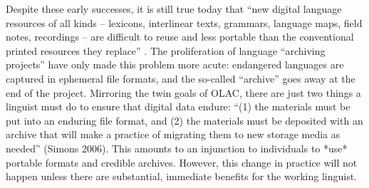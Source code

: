 
Despite these early successes, it is still true today that ``new
digital language resources of all kinds -- lexicons, interlinear
texts, grammars, language maps, field notes, recordings -- are
difficult to reuse and less portable than the conventional printed
resources they replace'' \citep{BirdSimons03language}.  The proliferation of
language ``archiving projects'' have only made this problem more
acute: endangered languages are captured in ephemeral file formats,
and the so-called ``archive'' goes away at the end of the project.
Mirroring the twin goals of OLAC, there are just two things a linguist
must do to ensure that digital data endure: ``(1) the materials must be
put into an enduring file format, and (2) the materials must be
deposited with an archive that will make a practice of migrating them
to new storage media as needed'' (Simons 2006).  This amounts to an
injunction to individuals to *use* portable formats and credible
archives.  However, this change in practice will not happen unless
there are substantial, immediate benefits for the working linguist.


\vspace{1in}




\vspace{1in}

